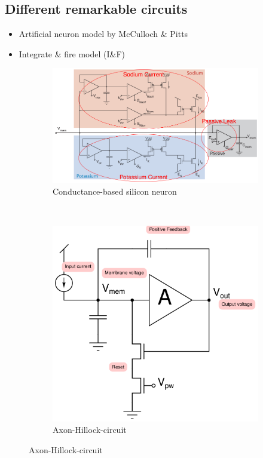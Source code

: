 \documentclass[english,11pt]{article}
\begin{document}
\subsection{Different remarkable circuits}
\begin{itemize}
\item Artificial neuron model by McCulloch \& Pitts
\item Integrate \& fire model (I\&F)
\end{itemize}
\begin{figure}[H]
        \centering
        \begin{subfigure}[b]{0.5\textwidth}
                \centering
\includegraphics[width=\textwidth]{conductance-based-SI-neuron.png}
                \caption{Conductance-based silicon neuron}
        \end{subfigure}%
        ~
        \begin{subfigure}[b]{0.5\textwidth}
                \centering
				\includegraphics[width=\textwidth]{axon-hillock-circuit.png}
                \caption{Axon-Hillock-circuit}
        \end{subfigure}
\end{figure}
\end{document}
